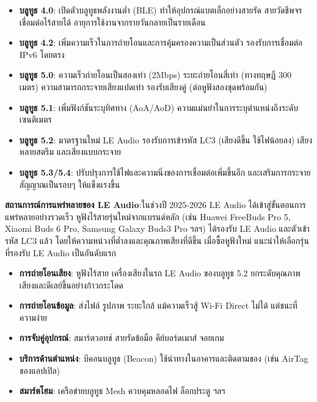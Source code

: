 
\begin{itemize}
  \item \textbf{บลูทูธ 4.0}: เปิดตัวบลูทูธพลังงานต่ำ (BLE) ทำให้อุปกรณ์แบตเล็กอย่างสายรัด สายวัดชีพจร เชื่อมต่อไร้สายได้ อายุการใช้งานจากรายวันกลายเป็นรายเดือน
  \item \textbf{บลูทูธ 4.2}: เพิ่มความเร็วในการถ่ายโอนและการคุ้มครองความเป็นส่วนตัว รองรับการเชื่อมต่อ IPv6 โดยตรง
  \item \textbf{บลูทูธ 5.0}: ความเร็วถ่ายโอนเป็นสองเท่า (2Mbps) ระยะถ่ายโอนสี่เท่า (ทางทฤษฎี 300 เมตร) ความสามารถกระจายเสียงแปดเท่า รองรับเสียงคู่ (ต่อหูฟังสองชุดพร้อมกัน)
  \item \textbf{บลูทูธ 5.1}: เพิ่มฟังก์ชันระบุทิศทาง (AoA/AoD) ความแม่นยำในการระบุตำแหน่งถึงระดับเซนติเมตร
  \item \textbf{บลูทูธ 5.2}: มาตรฐานใหม่ LE Audio รองรับการเข้ารหัส LC3 (เสียงดีขึ้น ใช้ไฟน้อยลง) เสียงหลายสตรีม และเสียงแบบกระจาย
  \item \textbf{บลูทูธ 5.3/5.4}: ปรับปรุงการใช้ไฟและความนิ่งของการเชื่อมต่อเพิ่มขึ้นอีก และเสริมการกระจายสัญญาณเป็นรอบๆ ให้แข็งแรงขึ้น
\end{itemize}

\textbf{สถานการณ์การแพร่หลายของ LE Audio}:ในช่วงปี 2025-2026 LE Audio ได้เข้าสู่ขั้นตอนการแพร่หลายอย่างรวดเร็ว หูฟังไร้สายรุ่นใหม่จากแบรนด์หลัก (เช่น Huawei FreeBuds Pro 5, Xiaomi Buds 6 Pro, Samsung Galaxy Buds3 Pro ฯลฯ) ได้รองรับ LE Audio และตัวเข้ารหัส LC3 แล้ว โดยให้ความหน่วงที่ต่ำลงและคุณภาพเสียงที่ดีขึ้น เมื่อซื้อหูฟังใหม่ แนะนำให้เลือกรุ่นที่รองรับ LE Audio เป็นอันดับแรก


\begin{itemize}
  \item \textbf{การถ่ายโอนเสียง}: หูฟังไร้สาย เครื่องเสียงในรถ LE Audio ของบลูทูธ 5.2 ยกระดับคุณภาพเสียงและดีเลย์ขึ้นอย่างก้าวกระโดด
  \item \textbf{การถ่ายโอนข้อมูล}: ส่งไฟล์ รูปภาพ ระยะใกล้ แม้ความเร็วสู้ Wi-Fi Direct ไม่ได้ แต่ชนะที่ความง่าย
  \item \textbf{การจับคู่อุปกรณ์}: สมาร์ตวอทช์ สายรัดข้อมือ คีย์บอร์ดเมาส์ จอยเกม
  \item \textbf{บริการด้านตำแหน่ง}: บีคอนบลูทูธ (Beacon) ใช้นำทางในอาคารและติดตามของ (เช่น AirTag ของแอปเปิล)
  \item \textbf{สมาร์ตโฮม}: เครือข่ายบลูทูธ Mesh ควบคุมหลอดไฟ ล็อกประตู ฯลฯ
\end{itemize}

